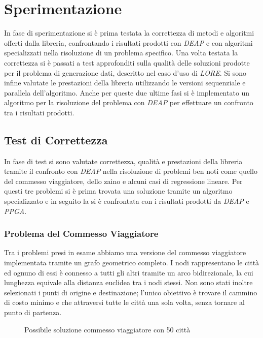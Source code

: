 \chapter{Sperimentazione}\label{cap: experiments}

In fase di sperimentazione si è prima testata la correttezza di metodi e
algoritmi offerti dalla libreria, confrontando i risultati prodotti con
\textit{DEAP} e con algoritmi specializzati nella risoluzione di un problema
specifico. Una volta testata la correttezza si è passati a test approfonditi
sulla qualità delle soluzioni prodotte per il problema di generazione dati,
descritto nel caso d'uso di \textit{LORE}. Si sono infine valutate le
prestazioni della libreria utilizzando le versioni sequenziale e parallela
dell'algoritmo. Anche per queste due ultime fasi si è implementato un algoritmo
per la risoluzione del problema con \textit{DEAP} per effettuare un confronto
tra i risultati prodotti.

\section{Test di Correttezza}

In fase di test si sono valutate correttezza, qualità e prestazioni della
libreria tramite il confronto con \textit{DEAP} nella risoluzione di problemi
ben noti come quello del commesso viaggiatore, dello zaino e alcuni casi di
regressione lineare. Per questi tre problemi si è prima trovata una soluzione
tramite un algoritmo specializzato e in seguito la si è confrontata con i
risultati prodotti da \textit{DEAP} e \textit{PPGA}.

\subsection{Problema del Commesso Viaggiatore}

Tra i problemi presi in esame abbiamo una versione del commesso viaggiatore
implementata tramite un grafo geometrico completo. I nodi rappresentano le
città ed ognuno di essi è connesso a tutti gli altri tramite un arco
bidirezionale, la cui lunghezza equivale alla distanza euclidea tra i nodi
stessi. Non sono stati inoltre selezionati i punti di origine e destinazione;
l'unico obiettivo è trovare il cammino di costo minimo e che attraversi tutte
le città una sola volta, senza tornare al punto di partenza.

\begin{figure}[H]
	\centering
	
	\caption{Possibile soluzione commesso viaggiatore con 50 città}
	\label{fig: deap_tsp}
\end{figure}

